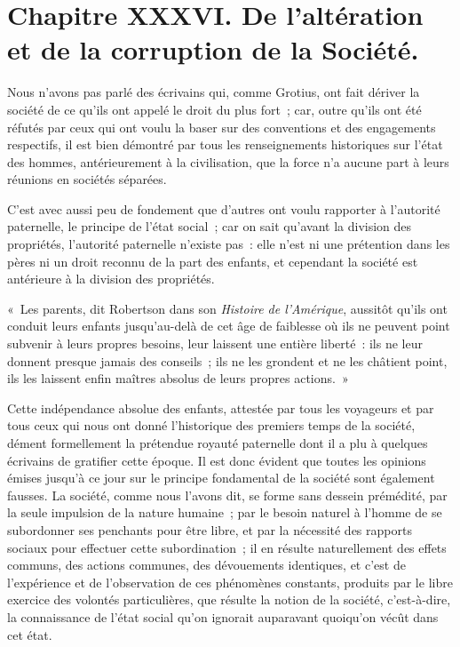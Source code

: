 \documentclass[french,twoside]{book} %
\newcommand\chapteropen{} %
\newcommand\chaptercont{} %
\begin{document}
\chapteropen
\chapter[{Chapitre XXXVI. De l’altération et de la corruption de la Société.}]{Chapitre XXXVI. De l’altération et de la corruption de la Société.}\renewcommand{\leftmark}{Chapitre XXXVI. De l’altération et de la corruption de la Société.}


\chaptercont
\noindent Nous n’avons pas parlé des écrivains qui, comme Grotius, ont fait dériver la société de ce qu’ils ont appelé le droit du plus fort ; car, outre qu’ils ont été réfutés par ceux qui ont voulu la baser sur des conventions et des engagements respectifs, il est bien démontré par tous les renseignements historiques sur l’état des hommes, antérieurement à la civilisation, que la force n’a aucune part à leurs réunions en sociétés séparées.\par
C’est avec aussi peu de fondement que d’autres ont voulu rapporter à l’autorité paternelle, le principe de l’état social ; car on sait qu’avant la division des propriétés, l’autorité paternelle n’existe pas : elle n’est ni une prétention dans les pères ni un droit reconnu de la part des enfants, et cependant la société est antérieure à la division des propriétés.\par
« Les parents, dit Robertson dans son {\itshape Histoire de l’Amérique}, aussitôt qu’ils ont conduit leurs enfants jusqu’au-delà de cet âge de faiblesse où ils ne peuvent point subvenir à leurs propres besoins, leur laissent une entière liberté : ils ne leur donnent presque jamais des conseils ; ils ne les grondent et ne les châtient point, ils les laissent enfin maîtres absolus de leurs propres actions. »\par
Cette indépendance absolue des enfants, attestée par tous les voyageurs et par tous ceux qui nous ont donné l’historique des premiers temps de la société, dément formellement la prétendue royauté paternelle dont il a plu à quelques écrivains de gratifier cette époque. Il est donc évident que toutes les opinions émises jusqu’à ce jour sur le principe fondamental de la société sont également fausses. La société, comme nous l’avons dit, se forme sans dessein prémédité, par la seule impulsion de la nature humaine ; par le besoin naturel à l’homme de se subordonner ses penchants pour être libre, et par la nécessité des rapports sociaux pour effectuer cette subordination ; il en résulte naturellement des effets communs, des actions communes, des dévouements identiques, et c’est de l’expérience et de l’observation de ces phénomènes constants, produits par le libre exercice des volontés particulières, que résulte la notion de la société, c’est-à-dire, la connaissance de l’état social qu’on ignorait auparavant quoiqu’on vécût dans cet état.\par
\end{document}
